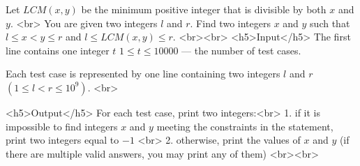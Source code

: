 Let $LCM(x,y)$ be the minimum positive integer that is divisible by both $x$ and $y$.
<br>
You are given two integers $l$ and $r$. Find two integers $x$ and $y$ such that $l \le x < y \le r$ and $l \le LCM(x, y) \le r$.
<br><br>
<h5>Input</h5>
The first line contains one integer $t$ $1 \le t \le 10000$ — the number of test cases.

Each test case is represented by one line containing two integers $l$ and $r$ $(1 \le l < r \le 10^9)$.
<br>

<h5>Output</h5>
For each test case, print two integers:<br>
1. if it is impossible to find integers $x$ and $y$ meeting the constraints in the statement, print two integers equal to $−1$ <br>
2. otherwise, print the values of $x$ and $y$ (if there are multiple valid answers, you may print any of them) <br><br>